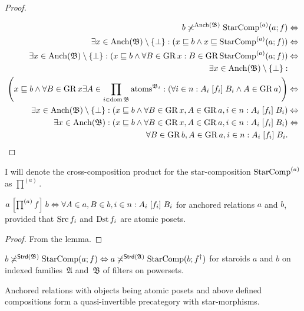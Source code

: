 \begin{proof}
~

\begin{align*}
b\not\asymp^{\operatorname{Anch}(\mathfrak{B})}\operatorname{StarComp}^{(a)}(a;f) & \Leftrightarrow\\
\exists x\in\operatorname{Anch}(\mathfrak{B})\setminus\{\bot\}:(x\sqsubseteq b\wedge x\sqsubseteq\operatorname{StarComp}^{(a)}(a;f)) & \Leftrightarrow\\
\exists x\in\operatorname{Anch}(\mathfrak{B})\setminus\{\bot\}:(x\sqsubseteq b\wedge\forall B\in\operatorname{GR} x:B\in\operatorname{GR}\operatorname{StarComp}^{(a)}(a;f)) & \Leftrightarrow\\
\exists x\in\operatorname{Anch}(\mathfrak{B})\setminus\{\bot\}:\\
\left(x\sqsubseteq b\wedge\forall B\in\operatorname{GR} x\exists A\in\prod_{i\in\operatorname{dom}\mathfrak{B}}\operatorname{atoms}^{\mathfrak{B}_{i}}:\left(\forall i\in n:A_{i}\mathrel{\left[f_{i}\right]}B_{i}\wedge A\in\operatorname{GR} a\right)\right) & \Leftrightarrow\\
\exists x\in\operatorname{Anch}(\mathfrak{B})\setminus\{\bot\}:\left(x\sqsubseteq b\wedge\forall B\in\operatorname{GR} x,A\in\operatorname{GR} a,i\in n:A_{i}\mathrel{\left[f_{i}\right]}B_{i}\right) & \Leftrightarrow\\
\exists x\in\operatorname{Anch}(\mathfrak{B}):\left(x\sqsubseteq b\wedge\forall B\in\operatorname{GR} x,A\in\operatorname{GR} a,i\in n:A_{i}\mathrel{\left[f_{i}\right]}B_{i}\right) & \Leftrightarrow\\
\forall B\in\operatorname{GR} b,A\in\operatorname{GR} a,i\in n:A_{i}\mathrel{\left[f_{i}\right]}B_{i}.
\end{align*}
\end{proof}
\begin{defn}
I will denote the cross-composition product for the star-composition
$\operatorname{StarComp}^{(a)}$ as $\prod^{(a)}$.\end{defn}
\begin{thm}
\label{a-b-cross-prod}$a\mathrel{\left[\prod^{(a)}f\right]}b\Leftrightarrow\forall A\in a,B\in b,i\in n:A_{i}\mathrel{\left[f_{i}\right]}B_{i}$
for anchored relations $a$ and $b$, provided that $\operatorname{Src} f_{i}$
and $\operatorname{Dst} f_{i}$ are atomic posets.\end{thm}
\begin{proof}
From the lemma.\end{proof}
\begin{conjecture}
$b\not\asymp^{\mathsf{Strd}(\mathfrak{B})}\operatorname{StarComp}(a;f)\Leftrightarrow a\not\asymp^{\mathsf{Strd}(\mathfrak{A})}\operatorname{StarComp}(b;f^{\dagger})$
for staroids $a$ and $b$ on indexed families~$\mathfrak{A}$ and~$\mathfrak{B}$
of filters on powersets.\end{conjecture}
\begin{thm}
Anchored relations with objects being atomic posets and above defined
compositions form a quasi-invertible precategory with star-morphisms.\end{thm}
